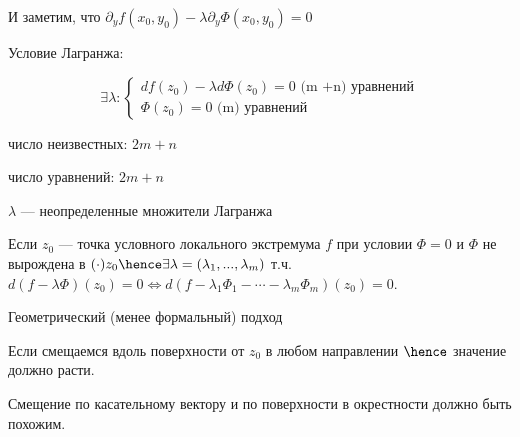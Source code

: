 И заметим, что $\partial_y f(x_0, y_0) - \lambda \partial_y \Phi(x_0, y_0) = 0$

Условие Лагранжа: 

\[
    \exists \lambda : 
    \begin{cases}
        df(z_0) - \lambda d\Phi(z_0) = 0 \text{ (m +n) уравнений} \\
        \Phi(z_0) = 0 \text{ (m) уравнений}
    \end{cases}
\]

число неизвестных: $2 m + n$

число уравнений: $2 m + n$

$\lambda$ --- неопределенные множители Лагранжа

\begin{theorem}
    Если $z_0$ --- точка условного локального экстремума $f$ при условии $\Phi = 0$ и $\Phi $ не вырождена в $(\cdot) z_0 \hence \exists \lambda = (\lambda_1, ..., \lambda_m)$ т.ч. $d(f - \lambda \Phi)(z_0) = 0 \Leftrightarrow d(f - \lambda_1 \Phi_1 - \cdots - \lambda_m \Phi_m)(z_0) = 0$. 
\end{theorem}


Геометрический (менее формальный) подход

Если смещаемся вдоль поверхности от $z_0$ в любом направлении $\hence$ значение должно расти.

Смещение по касательному вектору и по поверхности в окрестности должно быть похожим.

\quad



